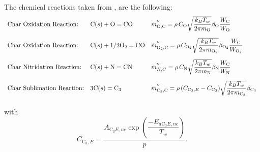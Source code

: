 \documentclass[10pt]{article}
\newcommand{\C}{\text{C}}
\newcommand{\Oo}{\text{O}}
\newcommand{\N}{\text{N}}
\begin{document}
 The chemical reactions taken from  \citet{Park-Ahn:1999},  \citet{Chen-Milos:2005} are the following:
% 
% 
% 
% 
%
\begin{equation}\label{eq:chemical_reactions}
\begin{array}{lll}
  \mbox{Char Oxidation Reaction:} & \C(s) + \Oo = \C\Oo& {\dot{m}_{\Oo,\C}}^{''}=\rho \, C_\Oo \sqrt {\dfrac{k_B T_w}{2 \pi m_\Oo} }  \beta_\Oo \dfrac{W_\C}{W_\Oo} \vspace{10pt}\\
%
\mbox{Char Oxidation Reaction:} & \C(s) + 1/2 \Oo_2 = \C\Oo & {\dot{m}_{\Oo_2,\C}}^{''}=\rho \, C_{\Oo_2} \sqrt {\dfrac{k_B T_w}{2 \pi m_{\Oo_2}} }  \beta_{\Oo_2} \dfrac{W_\C}{W_{\Oo_2}} \vspace{10pt}\\
%
\mbox{Char Nitridation Reaction:} &\C(s) + \N = \C\N & {\dot{m}_{N,C}}^{''}=\rho  \,C_\N \sqrt {\dfrac{k_B T_w}{2 \pi m_\N }} \beta_\N \dfrac{W_\C}{W_\N} \vspace{10pt}\\
%
\mbox{Char Sublimation Reaction:} &3\C(s) = \C_3 &{\dot{m}_{\C_3,\C}}^{''}=\rho  \,(C_{{\C_3},E}-C_{\C_3}) \sqrt {\dfrac{k_B T_w}{2 \pi m_{\C_3}} } \beta_{\C_3}\vspace{10pt}\\
%
 \end{array}
\end{equation}
with $$C_{{\C_3},E} = \dfrac{A_{{\C_{3}E},{nc}} \exp \left(\dfrac{- E_{a\C_3 E,nc}}{T_w}\right)}{p}.$$
\end{document}
